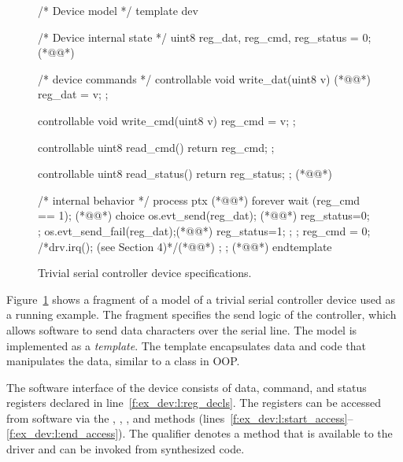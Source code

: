 \begin{figure}
\begin{tsllisting}[name=ex]
/* Device model */
template dev 

    /* Device internal state */
    uint8 reg_dat, reg_cmd, reg_status = 0; (*@\label{f:ex_dev:l:reg_decls}@*)

    /* device commands */
    controllable void write_dat(uint8 v) { (*@\label{f:ex_dev:l:start_access}@*)
        reg_dat = v; 
    };

    controllable void write_cmd(uint8 v) { 
        reg_cmd = v; 
    };

    controllable uint8 read_cmd() { 
        return reg_cmd; 
    };

    controllable uint8 read_status() { 
        return reg_status; 
    }; (*@\label{f:ex_dev:l:end_access}@*)

    /* internal behavior */
    process ptx { (*@\label{f:ex_dev:l:start_xmit}@*)
        forever {
            wait (reg_cmd == 1); (*@\label{f:ex_dev:l:wait}@*)
            choice {
                { 
                    os.evt_send(reg_dat); (*@\label{f:ex_dev:l:cb_succ}@*)
                    reg_status=0; 
                };
                { 
                    os.evt_send_fail(reg_dat);(*@\label{f:ex_dev:l:cb_fail}@*)
                    reg_status=1; 
                };
            };
            reg_cmd = 0;
            /*drv.irq(); (see Section 4)*/(*@\label{f:ex_dev:l:irq}@*)
        };
    }; (*@\label{f:ex_dev:l:end_xmit}@*)
endtemplate
\end{tsllisting}
\caption{Trivial serial controller device specifications.}
\label{f:ex_dev}
\end{figure}

Figure~\ref{f:ex_dev} shows a fragment of a model of a trivial serial controller device used as a running example.  The fragment specifies the send logic of the controller, which allows software to send data characters over the serial line.  The model is implemented as a \tsl \emph{template}.  The template encapsulates data and code that manipulates the data, similar to a class in OOP.

The software interface of the device consists of data, command, and status registers declared in line~\ref{f:ex_dev:l:reg_decls}.  The registers can be accessed from software via the , , , and  methods (lines~\ref{f:ex_dev:l:start_access}--\ref{f:ex_dev:l:end_access}).  The  qualifier denotes a method that is available to the driver and can be invoked from synthesized code.

